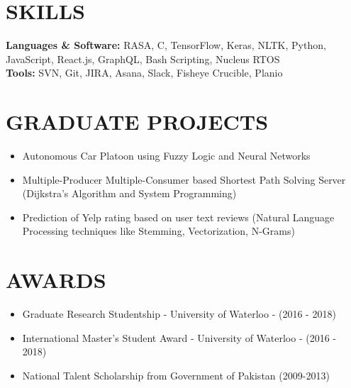 \documentclass[margin, 10pt]{res} %
\begin{document}
\begin{resume}
\section{SKILLS} 


\textbf{Languages \& Software:}
RASA, C, TensorFlow, Keras, NLTK, Python, JavaScript, React.js, GraphQL, Bash Scripting, Nucleus RTOS\\
\textbf{Tools:} SVN, Git, JIRA, Asana, Slack, Fisheye Crucible, Planio
\section{GRADUATE PROJECTS}

\begin{itemize} \itemsep -2pt %
\item Autonomous Car Platoon using Fuzzy Logic and Neural Networks
\item Multiple-Producer Multiple-Consumer based Shortest Path Solving Server (Dijkstra's Algorithm and System Programming)
\item Prediction of Yelp rating based on user text reviews (Natural Language Processing techniques like Stemming, Vectorization, N-Grams)
\end{itemize}

\section{AWARDS} 

\begin{itemize} \itemsep -2pt %
\item Graduate Research Studentship - University of Waterloo - (2016 - 2018)
\item International Master's Student Award - University of Waterloo - (2016 - 2018)
\item National Talent Scholarship from Government of Pakistan (2009-2013)
\end{itemize}


\end{resume}
\end{document}
